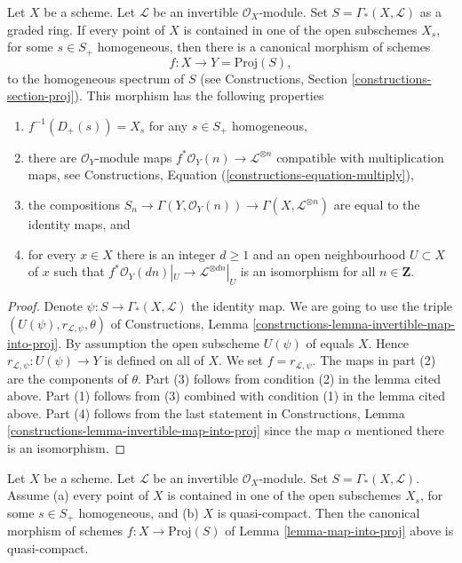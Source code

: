 \begin{lemma}
\label{lemma-map-into-proj}
Let $X$ be a scheme.
Let $\mathcal{L}$ be an invertible $\mathcal{O}_X$-module.
Set $S = \Gamma_*(X, \mathcal{L})$ as a graded ring.
If every point of $X$ is contained in one of the
open subschemes $X_s$, for some $s \in S_{+}$ homogeneous, then
there is a canonical morphism of schemes
$$
f : X \longrightarrow Y = \text{Proj}(S),
$$
to the homogeneous spectrum of $S$ (see
Constructions, Section \ref{constructions-section-proj}).
This morphism has the following properties
\begin{enumerate}
\item $f^{-1}(D_{+}(s)) = X_s$ for any $s \in S_{+}$ homogeneous,
\item there are $\mathcal{O}_Y$-module maps
$f^*\mathcal{O}_Y(n) \to \mathcal{L}^{\otimes n}$
compatible with multiplication maps, see
Constructions, Equation (\ref{constructions-equation-multiply}),
\item the compositions
$S_n \to
\Gamma(Y, \mathcal{O}_Y(n)) \to
\Gamma(X, \mathcal{L}^{\otimes n})$
are equal to the identity maps, and
\item for every $x \in X$ there is an integer $d \geq 1$
and an open neighbourhood $U \subset X$ of $x$
such that $f^*\mathcal{O}_Y(dn)|_U \to \mathcal{L}^{\otimes dn}|_U$
is an isomorphism for all $n \in \mathbf{Z}$.
\end{enumerate}
\end{lemma}

\begin{proof}
Denote $\psi : S \to \Gamma_*(X, \mathcal{L})$ the identity map.
We are going to use the triple
$(U(\psi), r_{\mathcal{L}, \psi}, \theta)$ of
Constructions, Lemma \ref{constructions-lemma-invertible-map-into-proj}.
By assumption the open subscheme $U(\psi)$ of equals $X$. Hence
$r_{\mathcal{L}, \psi} : U(\psi) \to Y$ is defined on all of $X$.
We set $f = r_{\mathcal{L}, \psi}$.
The maps in part (2) are the components of $\theta$.
Part (3) follows from condition (2) in the lemma cited above.
Part (1) follows from (3) combined with condition (1) in the lemma
cited above. Part (4) follows from the last statement in
Constructions, Lemma \ref{constructions-lemma-invertible-map-into-proj}
since the map $\alpha$ mentioned there is an isomorphism.
\end{proof}

\begin{lemma}
\label{lemma-map-into-proj-quasi-compact}
Let $X$ be a scheme. Let $\mathcal{L}$ be an invertible $\mathcal{O}_X$-module.
Set $S = \Gamma_*(X, \mathcal{L})$.
Assume (a) every point of $X$ is contained in one of the
open subschemes $X_s$, for some $s \in S_{+}$ homogeneous,
and (b) $X$ is quasi-compact. Then the canonical morphism of schemes
$f : X \longrightarrow \text{Proj}(S)$ of Lemma \ref{lemma-map-into-proj}
above is quasi-compact.
\end{lemma}


